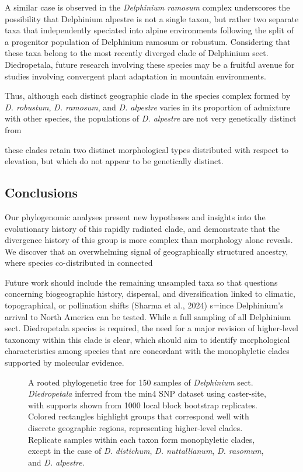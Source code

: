 \documentclass[11pt]{article}
\newcommand{\beginsupplement}{%
	\setcounter{table}{0}
	\setcounter{figure}{0}
	\renewcommand{\thetable}{S\arabic{table}}%
	\renewcommand{\thefigure}{S\arabic{figure}}%
}
\begin{document}
A similar case is observed in the \emph{Delphinium ramosum} complex underscores the possibility that Delphinium alpestre is not a single taxon, but rather two separate taxa that independently speciated into alpine environments following the split of a progenitor population of Delphinium ramosum or robustum. Considering that these taxa belong to the most recently diverged clade of Delphinium sect. Diedropetala, future research involving these species may be a fruitful avenue for studies involving convergent plant adaptation in mountain environments.

Thus, although each distinct geographic clade in the species complex formed by 
\emph{D. robustum}, \emph{D. ramosum}, and \emph{D. alpestre} varies in its
proportion of admixture with other species, the populations of \emph{D. alpestre}
are not very genetically distinct from 

these clades retain two distinct
morphological types distributed with respect to elevation, but which do not
appear to be genetically distinct. 
% 


\subsection{Conclusions}
Our phylogenomic analyses present new hypotheses and insights into the evolutionary
history of this rapidly radiated clade, and demonstrate that the divergence history
of this group is more complex than morphology alone reveals. 
% 
We discover that an overwhelming signal of geographically structured ancestry, 
where species co-distributed in connected 

Future work should include the remaining unsampled taxa so that questions concerning biogeographic history, dispersal, and diversification linked to climatic, topographical, or pollination shifts (Sharma et al., 2024) s=ince Delphinium’s arrival to North America can be tested. While a full sampling of all Delphinium sect. Diedropetala species is required, the need for a major revision of higher-level taxonomy within this clade is clear, which should aim to identify morphological characteristics among species that are concordant with the monophyletic clades supported by molecular evidence.



  



\beginsupplement

\begin{figure}[p]
	\centering
	\caption{
		A rooted phylogenetic tree for 150 samples of \emph{Delphinium} sect. \emph{Diedropetala}
		inferred from the min4 SNP dataset using caster-site, with supports shown from
		1000 local block bootstrap replicates. 
		Colored rectangles highlight
		groups that correspond well with discrete geographic regions, representing higher-level 
		clades. Replicate samples within each taxon form monophyletic clades, except in the case
		of \emph{D. distichum}, \emph{D. nuttallianum}, \emph{D. rasomum}, and \emph{D. alpestre}.
	}
	\label{fig:S1}
\end{figure}
\end{document}
